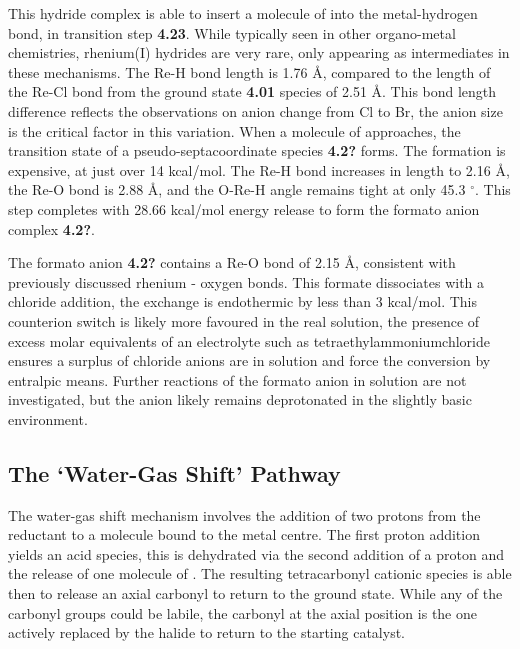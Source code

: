 This hydride complex is able to insert a molecule of  into the metal-hydrogen bond, in transition step \textbf{4.23}. While typically seen in other organo-metal chemistries, rhenium(I) hydrides are very rare, only appearing as intermediates in these mechanisms. The Re-H bond length is 1.76 \r{A}, compared to the length of the Re-Cl bond from the ground state \textbf{4.01} species of 2.51 \r{A}. This bond length difference reflects the observations on anion change from Cl to Br, the anion size is the critical factor in this variation. When a molecule of  approaches, the transition state of a pseudo-septacoordinate species \textbf{4.2?} forms. The formation is expensive, at just over 14 kcal/mol. The Re-H bond increases in length to 2.16 \r{A}, the Re-O bond is 2.88 \r{A}, and the O-Re-H angle remains tight at only 45.3 $^\circ$. This step completes with 28.66 kcal/mol energy release to form the formato anion complex \textbf{4.2?}. 

The formato anion \textbf{4.2?} contains a Re-O bond of 2.15 \r{A}, consistent with previously discussed rhenium - oxygen bonds. This formate dissociates with a chloride addition, the exchange is endothermic by less than 3 kcal/mol. This counterion switch is likely more favoured in the real solution, the presence of excess molar equivalents of an electrolyte such as tetraethylammoniumchloride ensures a surplus of chloride anions are in solution and force the conversion by entralpic means. Further reactions of the formato anion in solution are not investigated, but the anion likely remains deprotonated in the slightly basic environment. 

\FloatBarrier

\subsection{The `Water-Gas Shift' Pathway}\label{ss.watergas}
The water-gas shift mechanism involves the addition of two protons from the reductant to a  molecule bound to the metal centre. The first proton addition yields an acid species, this is dehydrated via the second addition of a proton and the release of one molecule of . The resulting tetracarbonyl cationic species is able then to release an axial carbonyl to return to the ground state. While any of the carbonyl groups could be labile, the carbonyl at the axial position is the one actively replaced by the halide to return to the starting catalyst\autocite{shaver1992}. 

